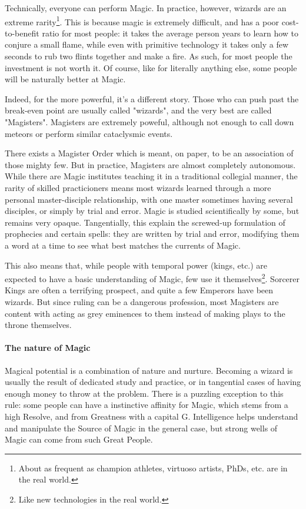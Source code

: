 Technically, everyone can perform Magic. In practice, however, wizards are an extreme rarity\footnote{About as frequent as champion athletes, virtuoso artists, PhDs, etc. are in the real world.}. This is because magic is extremely difficult, and has a poor cost-to-benefit ratio for most people: it takes the average person years to learn how to conjure a small flame, while even with primitive technology it takes only a few seconds to rub two flints together and make a fire. As such, for most people the investment is not worth it. Of course, like for literally anything else, some people will be naturally better at Magic. 

Indeed, for the more powerful, it's a different story. Those who can push past the break-even point are usually called "wizards", and the very best are called "Magisters". Magisters are extremely poweful, although not enough to call down meteors or perform similar cataclysmic events.

There exists a Magister Order which is meant, on paper, to be an association of those mighty few. But in practice, Magisters are almost completely autonomous. While there are Magic institutes teaching it in a traditional collegial manner, the rarity of skilled practicioners means most wizards learned through a more personal master-disciple relationship, with one master sometimes having several disciples, or simply by trial and error. Magic is studied scientifically by some, but remains very opaque. Tangentially, this explain the screwed-up formulation of prophecies and certain spells: they are written by trial and error, modifying them a word at a time to see what best matches the currents of Magic. 

This also means that, while people with temporal power (kings, etc.) are expected to have a basic understanding of Magic, few use it themselves\footnote{Like new technologies in the real world.}. Sorcerer Kings are often a terrifying prospect, and quite a few Emperors have been wizards. But since ruling can be a dangerous profession, most Magisters are content with acting as grey eminences to them instead of making plays to the throne themselves.

\paragraph{The nature of Magic} 

Magical potential is a combination of nature and nurture. Becoming a wizard is usually the result of dedicated study and practice, or in tangential cases of having enough money to throw at the problem. There is a puzzling exception to this rule: some people can have a instinctive affinity for Magic, which stems from a high Resolve, and from Greatness with a capital G. Intelligence helps understand and manipulate the Source of Magic in the general case, but strong wells of Magic can come from such Great People.

